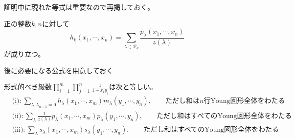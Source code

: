 \documentclass{ltjsreport}
\begin{document}
証明中に現れた等式は重要なので再掲しておく。

\begin{prop}\label{p_to_h}
  正の整数$k,n$に対して
  \[
    h_k(x_1,\cdots,x_n)=\sum_{\lambda\in\mathcal{P}_{k}}\frac{p_\lambda(x_1,\cdots,x_n)}{z(\lambda)}
  \]
  が成り立つ。
\end{prop}

後に必要になる公式を用意しておく


\begin{lemm}[Cauchyの等式]\label{formal_power_series_relation}
  形式的べき級数$\prod_{i=1}^m\prod_{j=1}^n\frac{1}{1-x_iy_j}$は次と等しい。
  \begin{align*}
    &\text{(i):}\:\sum_{\lambda,\lambda_{n+1}=0}h_\lambda(x_1,\cdots,x_m)m_\lambda(y_1,\cdots,y_n),\qquad \text{ただし和は$n$行Young図形全体をわたる}\\
    &\text{(ii):}\:\sum_{\lambda}\frac{1}{z(\lambda)}p_\lambda(x_1,\cdots,x_m)p_\lambda(y_1,\cdots,y_n),\qquad \text{ただし和はすべてのYoung図形全体をわたる}\\
    &\text{(iii):}\:\sum_{\lambda}s_\lambda(x_1,\cdots,x_m)s_\lambda(y_1,\cdots,y_n),\qquad \text{ただし和はすべてのYoung図形全体をわたる}
  \end{align*}
\end{lemm}
\end{document}
